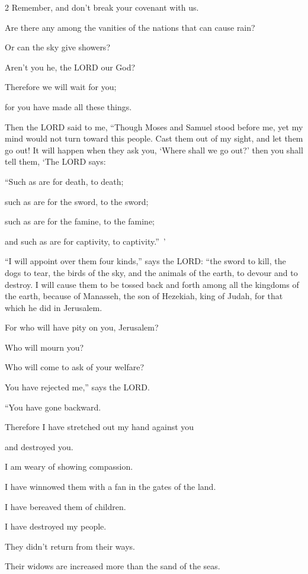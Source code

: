 \begin{multicols}{2}
Remember, and don’t break your covenant with us.


\myverse{}Are there any among the vanities of the nations that can cause
rain?

Or can the sky give showers?

Aren’t you he, the LORD our God?

Therefore we will wait for you;

for you have made all these things.


\mychapter{} \myverse*{}Then the LORD said to me, “Though Moses and Samuel stood before me, yet my mind would not turn toward this people. Cast them out of my sight, and let them go out! \myverse{}It will happen when they ask you, ‘Where shall we go out?’ then you shall tell them, ‘The LORD says:

“Such as are for death, to death;

such as are for the sword, to the sword;

such as are for the famine, to the famine;

and such as are for captivity, to captivity.” ’


\myverse{}“I will appoint over them four kinds,” says the LORD: “the sword to kill, the dogs to tear, the birds of the sky, and the animals of the earth, to devour and to destroy. \myverse{}I will cause them to be tossed back and forth among all the kingdoms of the earth, because of Manasseh, the son of Hezekiah, king of Judah, for that which he did in Jerusalem.


\myverse{}For who will have pity on you, Jerusalem?

Who will mourn you?

Who will come to ask of your welfare?


\myverse{}You have rejected me,” says the LORD.

“You have gone backward.

Therefore I have stretched out my hand against you

and destroyed you.

I am weary of showing compassion.


\myverse{}I have winnowed them with a fan in the gates of the land.

I have bereaved them of children.

I have destroyed my people.

They didn’t return from their ways.


\myverse{}Their widows are increased more than the sand of the seas.


\end{multicols}
